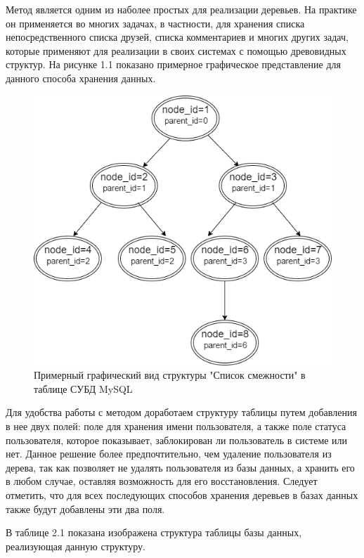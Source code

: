 \documentclass[a4paper,14pt]{extreport}
\theoremstyle{definition}
\begin{document}
Метод является одним из наболее простых для реализации деревьев. На практике он применяется во многих задачах, в частности, для хранения списка непосредственного списка друзей, списка комментариев и многих других задач, которые применяют для реализации в своих системах с помощью древовидных структур. На рисунке 1.1 показано примерное графическое представление для данного способа хранения данных.
\begin{figure}[h!]
\begin{center}
\includegraphics[width=12cm]{11.png}
\caption{Примерный графический вид структуры "Список смежности" в таблице СУБД MySQL}
\label{fig:3}
\end{center}
\end{figure}
Для удобства работы с методом доработаем структуру таблицы путем добавления в нее двух полей: поле для хранения имени пользователя, а также поле статуса пользователя, которое показывает, заблокирован ли пользователь в системе или нет. Данное решение более предпочтительно, чем удаление пользователя из дерева, так как позволяет не удалять пользователя  из базы данных, а хранить его в любом случае, оставляя возможность для его восстановления. Следует отметить, что для всех последующих способов хранения деревьев в базах данных также будут добавлены эти два поля.

В таблице 2.1 показана изображена структура таблицы базы данных, реализующая данную структуру.
\end{document}
